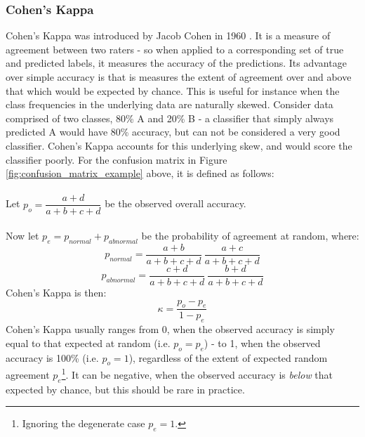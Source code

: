 \documentclass[11pt]{article} %
\theoremstyle{plain}
\theoremstyle{definition}
\begin{document}
\subsubsection{Cohen's Kappa}
Cohen's Kappa was introduced by Jacob Cohen in 1960 \cite{cohens_kappa}. It is a measure of agreement between two raters - so when applied to a corresponding set of true and predicted labels, it measures the accuracy of the predictions. Its advantage over simple accuracy is that is measures the extent of agreement over and above that which would be expected by chance. This is useful for instance when the class frequencies in the underlying data are naturally skewed. Consider data comprised of two classes, 80\% A and 20\% B - a classifier that simply always predicted A would have 80\% accuracy, but can not be considered a very good classifier. Cohen's Kappa accounts for this underlying skew, and would score the classifier poorly. For the confusion matrix in Figure \ref{fig:confusion_matrix_example} above, it is defined as follows:
\\
\\
\noindent
Let \(p_o = \dfrac{a+d}{a+b+c+d}\) be the observed overall accuracy.
\\
\\
\noindent
Now let \(p_e = p_{normal} + p_{abnormal}\) be the probability of agreement at random, where:
\[p_{normal} = \dfrac{a+b}{a+b+c+d} \ \dfrac{a+c}{a+b+c+d} \]
\[p_{abnormal} = \dfrac{c+d}{a+b+c+d} \ \dfrac{b+d}{a+b+c+d} \]
Cohen's Kappa is then:
\[ \kappa = \dfrac{p_o - p_e}{1-p_e} \]
Cohen's Kappa usually ranges from 0, when the observed accuracy is simply equal to that expected at random (i.e. \(p_o = p_e\)) - to 1, when the observed accuracy is 100\% (i.e. \(p_o=1\)), regardless of the extent of expected random agreement \(p_e\)\footnote{Ignoring the degenerate case \(p_e=1\).}. It can be negative, when the observed accuracy is \textit{below} that expected by chance, but this should be rare in practice.
\end{document}
